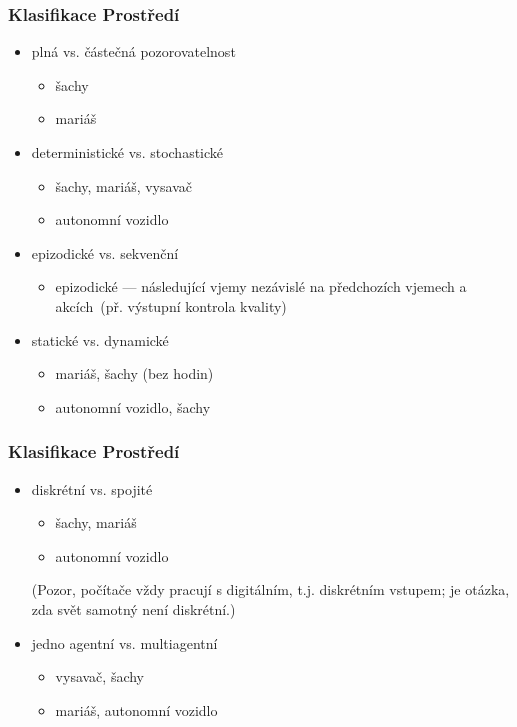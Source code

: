 \documentclass[red,professionalfont]{beamer}
\theoremstyle{definition}
\newcommand{\0}{\mbox{${\bf 0}$}}
\begin{document}
\begin{frame}\frametitle{Klasifikace Prostředí}
 \begin{itemize}
  \item plná vs. částečná pozorovatelnost\pause
  \begin{itemize}
    \item šachy\pause
    \item mariáš\pause
  \end{itemize}
  \item deterministické vs. stochastické\pause
  \begin{itemize}
    \item šachy, mariáš, vysavač\pause
    \item autonomní vozidlo\pause
  \end{itemize}
  \item epizodické vs. sekvenční\pause
  \begin{itemize}
   \item epizodické --- následující vjemy nezávislé na předchozích vjemech a akcích\pause\ (př. výstupní kontrola kvality)\pause
  \end{itemize}
  \item statické vs. dynamické\pause
  \begin{itemize}
   \item mariáš, šachy (bez hodin)\pause
   \item autonomní vozidlo, šachy
  \end{itemize}
\end{itemize}
\end{frame}
\begin{frame}\frametitle{Klasifikace Prostředí}
\begin{itemize}
  \item diskrétní vs. spojité\pause
  \begin{itemize}
   \item šachy, mariáš\pause
   \item autonomní vozidlo
  \end{itemize}\pause
  (Pozor, počítače vždy pracují s \alert{digitálním}, t.j. diskrétním vstupem; je otázka, zda svět samotný není diskrétní.)\pause
  \item jedno agentní vs. multiagentní\pause
  \begin{itemize}
   \item vysavač, šachy\pause
   \item mariáš, autonomní vozidlo
  \end{itemize}
 \end{itemize}
\end{frame}
\end{document}
